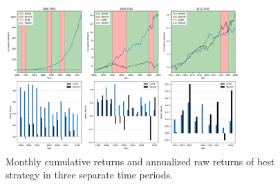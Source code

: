 \documentclass{article}
\begin{document}
\newpage

\begin{figure}[H]
    \centering
    \includegraphics[width=0.8\textwidth]{2020_plot2_model_comparison_timeperiods.png}
    \caption{Monthly cumulative returns and annualized raw returns of best strategy in three separate time periods.}
    \vspace{-10pt}
    \label{fig:timeperiods}
\end{figure}
\end{document}
